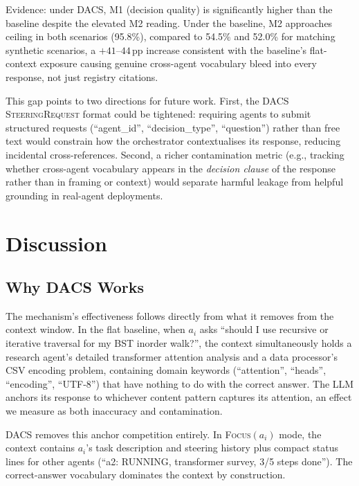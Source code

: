 \documentclass{article}
\begin{document}
Evidence: under DACS, M1 (decision quality) is significantly higher than
the baseline despite the elevated M2 reading.
Under the baseline, M2 approaches ceiling in both scenarios (95.8\%),
compared to 54.5\% and 52.0\% for matching synthetic scenarios, a
$+41$--$44$\,pp increase consistent with the baseline's flat-context
exposure causing genuine cross-agent vocabulary bleed into every response,
not just registry citations.

This gap points to two directions for future work.
First, the DACS \textsc{SteeringRequest} format could be tightened:
requiring agents to submit structured requests (``agent\_id'',
``decision\_type'', ``question'') rather than free text would constrain
how the orchestrator contextualises its response, reducing
incidental cross-references.
Second, a richer contamination metric (e.g., tracking whether
cross-agent vocabulary appears in the \emph{decision clause} of the
response rather than in framing or context) would separate harmful
leakage from helpful grounding in real-agent deployments.

\section{Discussion}
\label{sec:discussion}

\subsection{Why DACS Works}

The mechanism's effectiveness follows directly from what it removes from
the context window.
In the flat baseline, when $a_i$ asks ``should I use recursive or
iterative traversal for my BST inorder walk?'', the context simultaneously
holds a research agent's detailed transformer attention analysis and a
data processor's CSV encoding problem, containing domain keywords
(``attention'', ``heads'', ``encoding'', ``UTF-8'') that have nothing to
do with the correct answer.
The LLM anchors its response to whichever content pattern captures its
attention, an effect we measure as both inaccuracy and contamination.

DACS removes this anchor competition entirely.
In \textsc{Focus}$(a_i)$ mode, the context contains $a_i$'s task
description and steering history plus compact status lines for other
agents (``a2: RUNNING, transformer survey, 3/5 steps done'').
The correct-answer vocabulary dominates the context by construction.
\end{document}
